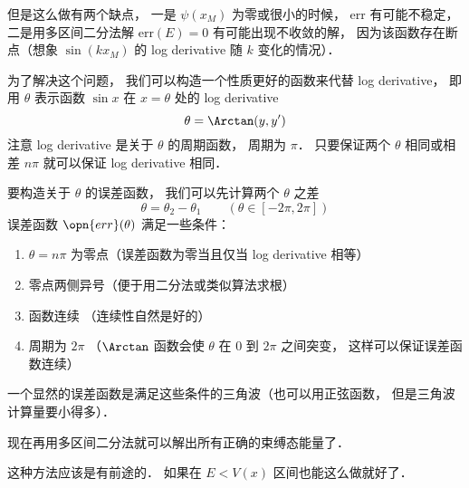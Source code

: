但是这么做有两个缺点， 一是 $\psi(x_M)$ 为零或很小的时候， err 有可能不稳定， 二是用多区间二分法解 $\text{err}(E) = 0$ 有可能出现不收敛的解， 因为该函数存在断点（想象 $\sin(k x_M)$ 的 log derivative 随 $k$ 变化的情况）．

为了解决这个问题， 我们可以构造一个性质更好的函数来代替 log derivative， 即用 $\theta$ 表示函数 $\sin x$ 在 $x = \theta$ 处的 log derivative
\begin{equation}
\theta = \Arctan(y, y')
\end{equation}
注意 log derivative 是关于 $\theta$ 的周期函数， 周期为 $\pi$． 只要保证两个 $\theta$ 相同或相差 $n\pi$ 就可以保证 log derivative 相同．

要构造关于 $\theta$ 的误差函数， 我们可以先计算两个 $\theta$ 之差
\begin{equation}
\theta = \theta_2 - \theta_1 \qquad (\theta \in [-2\pi, 2\pi])
\end{equation}
误差函数 $\opn{err}(\theta)$ 满足一些条件：
\begin{enumerate}
\item $\theta = n\pi$ 为零点（误差函数为零当且仅当 log derivative 相等）
\item 零点两侧异号（便于用二分法或类似算法求根）
\item 函数连续 （连续性自然是好的）
\item 周期为 $2\pi$ （$\Arctan$ 函数会使 $\theta$ 在 0 到 $2\pi$ 之间突变， 这样可以保证误差函数连续）
\end{enumerate}

一个显然的误差函数是满足这些条件的三角波（也可以用正弦函数， 但是三角波计算量要小得多）．

现在再用多区间二分法就可以解出所有正确的束缚态能量了．


 这种方法应该是有前途的． 如果在 $E < V(x)$ 区间也能这么做就好了．
